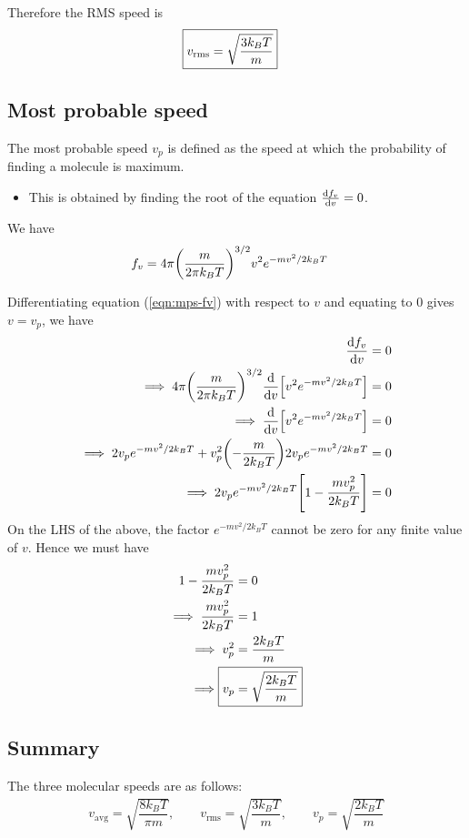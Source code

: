 		Therefore the RMS speed is
		\begin{align*}
			\Aboxed{v_\text{rms}&=\sqrt{\dfrac{3k_BT}{m}}}
		\end{align*}
	
	\subsection{Most probable speed}
		\setcounter{equation}{0}
		The most probable speed $v_p$ is defined as the speed at which the probability of finding a molecule is maximum.
		\begin{itemize}
			\item This is obtained by finding the root of the equation $\dv{f_v}{v}=0$.
		\end{itemize}
		
		We have
		\begin{align}
			f_v&=4\pi\qty(\dfrac{m}{2\pi k_BT})^{3/2}v^2e^{-mv^2/2k_BT} \label{eqn:mps-fv}
		\end{align}
		
		Differentiating equation (\ref{eqn:mps-fv}) with respect to $v$ and equating to 0 gives $v=v_p$, we have
		\begin{align*}
			\dv{f_v}{v}&=0 \\
			\implies 4\pi\qty(\dfrac{m}{2\pi k_BT})^{3/2}\dv{v}\qty[v^2e^{-mv^2/2k_BT}]&=0 \\
			\implies\dv{v}\qty[v^2e^{-mv^2/2k_BT}]&=0 \\
			\implies 2v_pe^{-mv^2/2k_BT}+v_p^2\qty(-\dfrac{m}{2k_BT})2v_pe^{-mv^2/2k_BT}&=0 \\
			\implies 2v_pe^{-mv^2/2k_BT}\qty[1-\dfrac{mv_p^2}{2k_BT}]&=0
		\end{align*}
		On the LHS of the above, the factor $e^{-mv^2/2k_BT}$ cannot be zero for any finite value of $v$. Hence we must have
		\begin{align*}
			1-\dfrac{mv_p^2}{2k_BT}&=0 \\
			\implies\dfrac{mv_p^2}{2k_BT}&=1 \\
			\implies v_p^2&=\dfrac{2k_BT}{m} \\
			\implies\Aboxed{v_p&=\sqrt{\dfrac{2k_BT}{m}}}
		\end{align*}
		
	\subsection*{Summary}
		The three molecular speeds are as follows:
		\begin{align*}
			v_\text{avg}=\sqrt{\dfrac{8k_BT}{\pi m}},\qquad v_\text{rms}=\sqrt{\dfrac{3k_BT}{m}},\qquad v_p=\sqrt{\dfrac{2k_BT}{m}}
		\end{align*}
		
